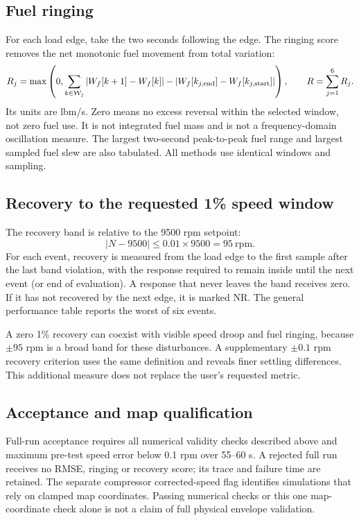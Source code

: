 \subsection{Fuel ringing}
For each load edge, take the two seconds following the edge. The ringing score removes the net monotonic fuel movement from total variation:
\begin{equation}
R_j=\max\left(0,\sum_{k\in\mathcal W_j}|W_f[k+1]-W_f[k]|-
|W_f[k_{j,\rm end}]-W_f[k_{j,\rm start}]|\right),\qquad R=\sum_{j=1}^{6}R_j.
\end{equation}
Its units are lbm/s. Zero means no excess reversal within the selected window, not zero fuel use. It is not integrated fuel mass and is not a frequency-domain oscillation measure. The largest two-second peak-to-peak fuel range and largest sampled fuel slew are also tabulated. All methods use identical windows and sampling.

\subsection{Recovery to the requested 1\% speed window}
The recovery band is relative to the 9500 rpm setpoint:
\begin{equation}
|N-9500|\leq0.01\times9500=95\ \mathrm{rpm}.
\end{equation}
For each event, recovery is measured from the load edge to the first sample after the last band violation, with the response required to remain inside until the next event (or end of evaluation). A response that never leaves the band receives zero. If it has not recovered by the next edge, it is marked NR. The general performance table reports the worst of six events.

A zero 1\% recovery can coexist with visible speed droop and fuel ringing, because $\pm95$ rpm is a broad band for these disturbances. A supplementary $\pm0.1$ rpm recovery criterion uses the same definition and reveals finer settling differences. This additional measure does not replace the user's requested metric.

\subsection{Acceptance and map qualification}
Full-run acceptance requires all numerical validity checks described above and maximum pre-test speed error below 0.1 rpm over 55--60 s. A rejected full run receives no RMSE, ringing or recovery score; its trace and failure time are retained. The separate compressor corrected-speed flag identifies simulations that rely on clamped map coordinates. Passing numerical checks or this one map-coordinate check alone is not a claim of full physical envelope validation.

